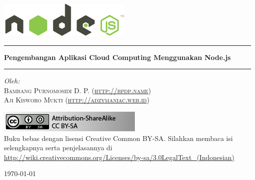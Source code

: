 \begin{titlepage}

\begin{center}

\includegraphics[scale=1]{images/logo-light.png}\\[1cm]

%

\hrule\vspace{5mm}
\noindent
{ \huge \bfseries Pengembangan Aplikasi Cloud Computing Menggunakan Node.js}\\[0.4cm]
\hrule\vspace{15mm}

\begin{center} \small
\emph{Oleh:}\\
\vspace{20mm}
\textsc{Bambang Purnomosidi D. P. (\url{http://bpdp.name})}\\
\textsc{Aji Kisworo Mukti (\url{http://adzymaniac.web.id})} 
\end{center}


\includegraphics[scale=1]{images/cc-by-sa.jpg}\\[1cm]

Buku bebas dengan lisensi Creative Common BY-SA. Silahkan membaca isi selengkapnya serta penjelasannya di \url{http://wiki.creativecommons.org/Licenses/by-sa/3.0LegalText_(Indonesian)}

\vfill

{\large \today}

\end{center}

\end{titlepage}
